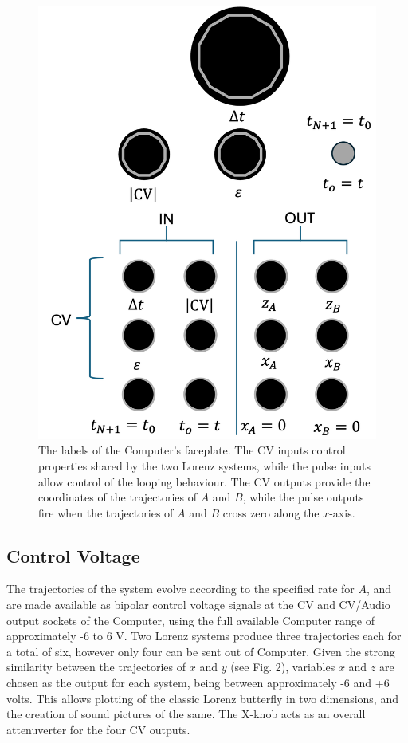\documentclass{tufte-handout}
\begin{document}
\begin{figure}[h]
  \includegraphics[width=\linewidth]{module_labels.png}%
  \caption{The labels of the Computer's faceplate. The CV inputs control properties shared by the two Lorenz systems, while the pulse inputs allow control of the looping behaviour. The CV outputs provide the coordinates of the trajectories of $A$ and $B$, while the pulse outputs fire when the trajectories of $A$ and $B$ cross zero along the $x$-axis.}%
  \label{fig:module_labels}%
\end{figure}

\subsection{Control Voltage}

The trajectories of the system evolve according to the specified rate for $A$, and are made available as bipolar control voltage signals at the CV and CV/Audio output sockets of the Computer, using the full available Computer range of approximately -6 to 6 V. Two Lorenz systems produce three trajectories each for a total of six, however only four can be sent out of Computer. Given the strong similarity between the trajectories of $x$ and $y$ (see Fig. 2), variables $x$ and $z$ are chosen as the output for each system, being between approximately -6 and +6 volts. This allows plotting of the classic Lorenz butterfly in two dimensions, and the creation of sound pictures of the same. The X-knob acts as an overall attenuverter for the four CV outputs.
\end{document}
